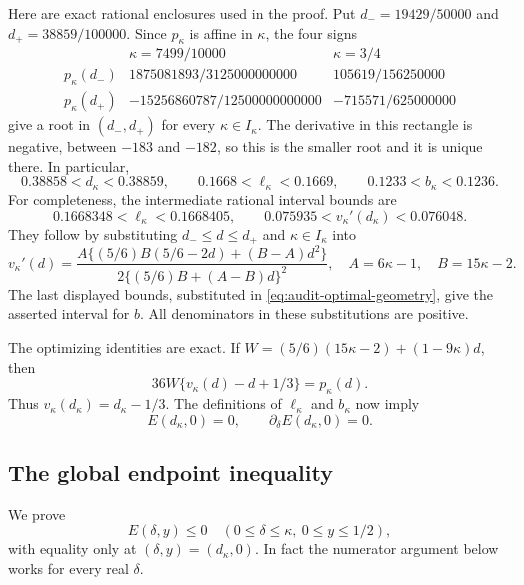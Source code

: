 \documentclass[11pt,a4paper]{article}
\numberwithin{equation}{section}
\theoremstyle{remark}
\begin{document}
Here are exact rational enclosures used in the proof.  Put
\(d_-=19429/50000\) and \(d_+=38859/100000\).
Since \(p_\kappa\) is affine in \(\kappa\), the four signs
\[
\begin{array}{c|cc}
 &\kappa=7499/10000&\kappa=3/4\\ \hline
 p_\kappa(d_-)&1875081893/3125000000000&105619/156250000\\
 p_\kappa(d_+)&-15256860787/12500000000000&-715571/625000000
\end{array}
\]
give a root in \((d_-,d_+)\) for every \(\kappa\in I_\kappa\).
The derivative in this rectangle is negative, between \(-183\) and
\(-182\), so this is the smaller root and it is unique there.
In particular,
\begin{equation}\label{eq:audit-parameter-box}
 0.38858<d_\kappa<0.38859,\qquad
 0.1668<\ell_\kappa<0.1669,\qquad
 0.1233<b_\kappa<0.1236.
\end{equation}
For completeness, the intermediate rational interval bounds are
\[
 0.1668348<\ell_\kappa<0.1668405,
 \qquad
 0.075935<v_\kappa'(d_\kappa)<0.076048.
\]
They follow by substituting \(d_-\le d\le d_+\) and
\(\kappa\in I_\kappa\) into
\[
 v_\kappa'(d)=
 \frac{A\{(5/6)B(5/6-2d)+(B-A)d^2\}}
 {2\{(5/6)B+(A-B)d\}^2},\quad
 A=6\kappa-1,\quad B=15\kappa-2.
\]
The last displayed bounds, substituted in
\eqref{eq:audit-optimal-geometry}, give the asserted interval for \(b\).
All denominators in these substitutions are positive.

The optimizing identities are exact.  If
\(W=(5/6)(15\kappa-2)+(1-9\kappa)d\), then
\[
 36W\{v_\kappa(d)-d+1/3\}=p_\kappa(d).
\]
Thus \(v_\kappa(d_\kappa)=d_\kappa-1/3\).  The definitions of
\(\ell_\kappa\) and \(b_\kappa\) now imply
\begin{equation}\label{eq:audit-double-contact}
 E(d_\kappa,0)=0,\qquad
 \partial_\delta E(d_\kappa,0)=0.
\end{equation}

\subsection{The global endpoint inequality}

We prove
\begin{equation}\label{eq:audit-global-endpoint}
 E(\delta,y)\le0
 \quad(0\le\delta\le\kappa,\ 0\le y\le1/2),
\end{equation}
with equality only at \((\delta,y)=(d_\kappa,0)\).
In fact the numerator argument below works for every real \(\delta\).
\end{document}
